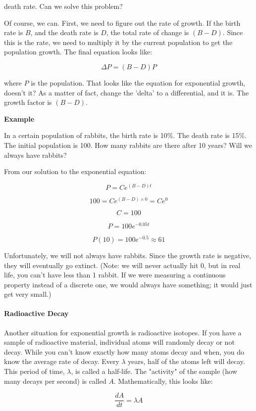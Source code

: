  death rate. Can we solve this problem?

Of course, we can. First, we need to figure out the rate of growth. If the birth rate is $B$, and the death rate is $D$, the total rate of change is $(B-D)$. Since this is the rate, we need to multiply it by the current population to get the population growth. The final equation looks like:

$$\Delta P = (B-D)P$$

where $P$ is the population. That looks like the equation for exponential growth, doesn't it? As a matter of fact, change the 'delta' to a differential, and it is. The growth factor is $(B-D)$.

\textbf{Example}

In a certain population of rabbits, the birth rate is 10\%. The death rate is 15\%. The initial population is 100. How many rabbits are there after 10 years? Will we always have rabbits?

From our solution to the exponential equation:

$$P = Ce^{(B-D)t}$$

$$100 = Ce^{(B-D) \times 0} = Ce^0$$

$$C = 100$$

$$P = 100e^{-0.05t}$$

$$P(10) = 100e^{-0.5} \approx 61$$

Unfortunately, we will not always have rabbits. Since the growth rate is negative, they will eventually go extinct. (Note: we will never actually hit 0, but in real life, you can't have less than 1 rabbit. If we were measuring a continuous property instead of a discrete one, we would always have something; it would just get very small.)

\paragraph{Radioactive Decay}

Another situation for exponential growth is radioactive isotopes. If you have a sample of radioactive material, individual atoms will randomly decay or not decay. While you can't know exactly how many atoms decay and when, you do know the average rate of decay. Every $\lambda$ years, half of the atoms left will decay. This period of time, $\lambda$, is called a half-life. The "activity" of the sample (how many decays per second) is called $A$. Mathematically, this looks like:

$$\frac{dA}{dt} = \lambda A$$

